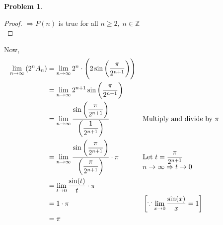 \documentclass[14]{article}
\theoremstyle{definition}
\newtheorem{prob}{Problem}
\theoremstyle{case}
\begin{document}
\begin{prob}
\begin{proof}
$\Rightarrow P(n)$ is true for all $n \geq 2,\; n \in \mathbb{Z}$\\
\end{proof}
Now,
\begin{align*}
\lim\limits_{n \to \infty} \left(2^n A_n\right) &= \lim\limits_{n \to \infty} 2^n \cdot \left( 2 \sin\left(\dfrac{\pi}{2^{n+1}}\right) \right)\\
&= \lim\limits_{n \to \infty} 2^{n+1} \sin \left(\dfrac{\pi}{2^{n+1}}\right)\\
&= \lim\limits_{n \to \infty} \dfrac{\sin \left(\dfrac{\pi}{2^{n+1}}\right)}{\left(\dfrac{1}{2^{n+1}}\right)} && \text{Multiply and divide by } \pi\\
&= \lim\limits_{n \to \infty} \dfrac{\sin \left(\dfrac{\pi}{2^{n+1}}\right)}{\left(\dfrac{\pi}{2^{n+1}}\right)} \cdot \pi && \parbox[t]{5cm}{Let $t = \dfrac{\pi}{2^{n + 1}}\\
n \to \infty \Rightarrow t \to 0
$}\\
&= \lim\limits_{t \to 0} \dfrac{\sin(t)}{t}\cdot \pi\\
&= 1 \cdot \pi && \left[\because \lim\limits_{x \to 0} \dfrac{\sin(x)}{x} = 1 \right]\\
&= \pi
\end{align*}
\end{prob}
\pagebreak
\end{document}

